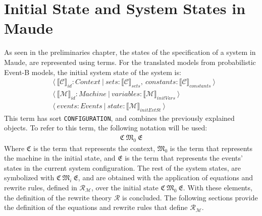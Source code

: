 \section{Initial State and System States in Maude}
As seen in the preliminaries chapter, the states of the specification of a system in Maude, are represented using terms. For the translated models from probabilistic Event-B models, the initial system state of the system is:
\begin{align*}
        &\langle \ \llbracket \mathscr{C} \rrbracket_{id} : Context \ | \ sets: \llbracket \mathscr{C} \rrbracket_{sets} , \ constants: \llbracket \mathscr{C} \rrbracket_{constants} \ \rangle \\
        & \langle \ \llbracket \mathscr{M} \rrbracket_{id} : Machine \ | \ variables: \llbracket \mathscr{M} \rrbracket_{initVars} \ \rangle \\
        & \langle \ events : Events \ | \ state :  \llbracket \mathscr{M} \rrbracket_{initEvtSt}  \ \rangle
\end{align*}
This term has sort \texttt{CONFIGURATION}, and combines the previously explained objects. To refer to this term, the following notation will be used:
    \begin{align*}
        \mathfrak{C} \ \mathfrak{M}_{0}  \ \mathfrak{E}
    \end{align*}
Where $\mathfrak{C}$ is the term that represents the context, $\mathfrak{M}_{0}$ is the term that represents the machine in the initial state, and $\mathfrak{E}$ is the term that represents the events' states in the current system configuration. The rest of the system states, are symbolized with $\mathfrak{C} \ \mathfrak{M}_{i}  \ \mathfrak{E}$, and are obtained with the application of equations and rewrite rules, defined in $\mathscr{R}_\mathscr{M}$,  over the initial state $\mathfrak{C} \ \mathfrak{M}_{0}  \ \mathfrak{E}$. With these elements, the definition of the rewrite theory $\mathscr{R}$ is concluded. The following sections provide the definition of the equations and rewrite rules that define $\mathscr{R}_\mathscr{M}$.

